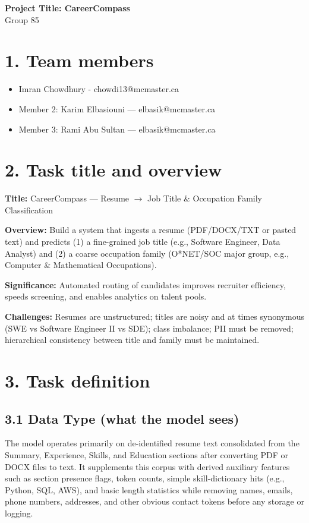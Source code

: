 \documentclass[12pt]{article}
\begin{document}
\begin{center}
  {\Large\bfseries Project Title: CareerCompass}\\[8pt]
  {\normalsize Group 85}
\end{center}

\section*{1. Team members}
\begin{itemize}
  \item Imran Chowdhury - chowdi13@mcmaster.ca
  \item Member 2: Karim Elbasiouni — elbasik@mcmaster.ca
  \item Member 3: Rami Abu Sultan — elbasik@mcmaster.ca
\end{itemize}

\section*{2. Task title and overview}
\noindent\textbf{Title:} CareerCompass — Resume $\rightarrow$ Job Title \& Occupation Family Classification

\noindent\textbf{Overview:} Build a system that ingests a resume (PDF/DOCX/TXT or pasted text) and predicts (1) a fine-grained job title (e.g., Software Engineer, Data Analyst) and (2) a coarse occupation family (O*NET/SOC major group, e.g., Computer \& Mathematical Occupations).

\noindent\textbf{Significance:} Automated routing of candidates improves recruiter efficiency, speeds screening, and enables analytics on talent pools. 

\noindent\textbf{Challenges:} Resumes are unstructured; titles are noisy and at times synonymous (SWE vs Software Engineer II vs SDE); class imbalance; PII must be removed; hierarchical consistency between title and family must be maintained.

\setlength{\parindent}{0pt}

\section*{3. Task definition}
\subsection*{3.1 Data Type (what the model sees)}
The model operates primarily on de-identified resume text consolidated from the Summary, Experience, Skills, and Education sections after converting PDF or DOCX files to text. It supplements this corpus with derived auxiliary features such as section presence flags, token counts, simple skill-dictionary hits (e.g., Python, SQL, AWS), and basic length statistics while removing names, emails, phone numbers, addresses, and other obvious contact tokens before any storage or logging.
\end{document}
